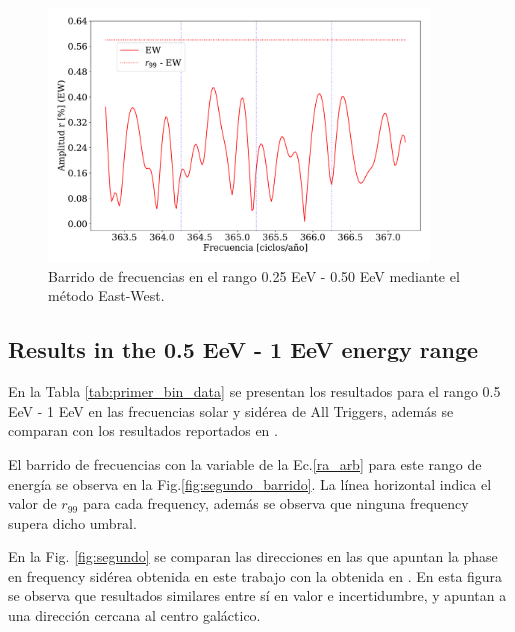 \documentclass[12pt, doublespace, oneside]{article}
\begin{document}
\begin{figure}[H]
    \begin{small}
        \begin{center}
            \vspace*{-0.6 cm}
            \includegraphics[width=0.9\textwidth]{Figs/plot_bin_1_barrido_v3_EW.pdf}
            \vspace*{-0.8 cm}
        \end{center}
        \caption{Barrido de frecuencias en el  rango 0.25 EeV - 0.50 EeV mediante el método East-West.}
        \label{fig:primer_barrido}
    \end{small}
\end{figure}

\subsection{Results in the 0.5 EeV - 1 EeV energy range}

En la Tabla \ref{tab:primer_bin_data} se presentan los resultados para el rango 0.5 EeV - 1 EeV en las frecuencias solar y sidérea de All Triggers, además se comparan con los resultados reportados en \cite{Aab_2020}.


El barrido de frecuencias con la variable de la Ec.\ref{ra_arb} para este rango de energía se observa en la Fig.\ref{fig:segundo_barrido}. La línea horizontal indica el valor de $r_{99}$ para cada frequency, además se observa que ninguna frequency supera dicho umbral. 


En la Fig. \ref{fig:segundo} se comparan las direcciones en las que apuntan la phase en frequency sidérea obtenida en este trabajo con la obtenida en \cite{Aab_2020}. En esta figura se observa que resultados similares entre sí en valor e incertidumbre, y apuntan a una dirección cercana al centro galáctico.
\end{document}
